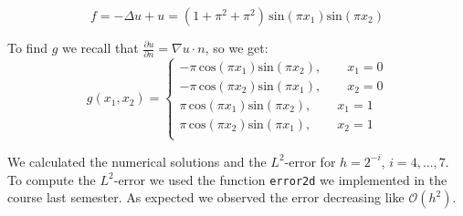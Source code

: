 \documentclass{article}
\begin{document}
\[
	f = -\Delta u + u = (1 + \pi^2 + \pi^2)\,\text{sin}(\pi x_1)\text{sin}(\pi x_2)
\]

To find $g$ we recall that $\frac{\partial u}{\partial n} = \nabla u \cdot n$, so we get:
\[
g(x_1,x_2) = \left\{
	\begin{aligned}
		-\pi\, \text{cos}(\pi x_1)\text{sin}(\pi x_2),\qquad x_1 = 0 \\
		-\pi\, \text{cos}(\pi x_2)\text{sin}(\pi x_1),\qquad x_2 = 0 \\
		\pi\, \text{cos}(\pi x_1)\text{sin}(\pi x_2),\qquad x_1 = 1 \\
		\pi\, \text{cos}(\pi x_2)\text{sin}(\pi x_1),\qquad x_2 = 1 \\
	\end{aligned}
	\right.
\]

We calculated the numerical solutions and the $L^2$-error for $h = 2^{-i}$, $i = 4,...,7$. \\
To compute the $L^2$-error we used the function \texttt{error2d} we implemented in the course last semester. As expected we observed the error decreasing like $\mathcal{O}(h^2)$.
\end{document}
